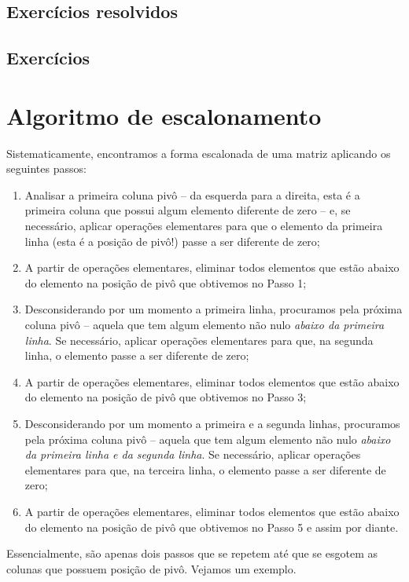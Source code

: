 \subsection*{Exercícios resolvidos}

\construirExeresol

\subsection*{Exercícios}

\construirExer


\section{Algoritmo de escalonamento}

Sistematicamente, encontramos a forma escalonada de uma matriz aplicando os seguintes passos:
\begin{enumerate}
  \item Analisar a primeira coluna pivô -- da esquerda para a direita, esta é a primeira coluna que possui algum elemento diferente de zero -- e, se necessário, aplicar operações elementares para que o elemento da primeira linha (esta é a posição de pivô!) passe a ser diferente de zero;
  \item A partir de operações elementares, eliminar todos elementos que estão abaixo do elemento na posição de pivô que obtivemos no Passo 1;
  \item Desconsiderando por um momento a primeira linha, procuramos pela próxima coluna pivô -- aquela que tem algum elemento não nulo \textit{abaixo da primeira linha}. Se necessário, aplicar operações elementares para que, na segunda linha, o elemento passe a ser diferente de zero;
  \item A partir de operações elementares, eliminar todos elementos que estão abaixo do elemento na posição de pivô que obtivemos no Passo 3;
  \item Desconsiderando por um momento a primeira e a segunda linhas, procuramos pela próxima coluna pivô -- aquela que tem algum elemento não nulo \textit{abaixo da primeira linha e da segunda linha}. Se necessário, aplicar operações elementares para que, na terceira linha, o elemento passe a ser diferente de zero;
  \item A partir de operações elementares, eliminar todos elementos que estão abaixo do elemento na posição de pivô que obtivemos no Passo 5 e assim por diante.
\end{enumerate} Essencialmente, são apenas dois passos que se repetem até que se esgotem as colunas que possuem posição de pivô. Vejamos um exemplo.

